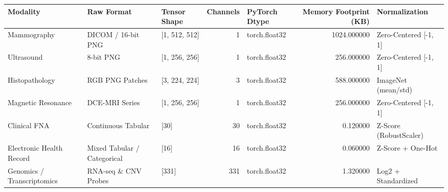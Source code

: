 \begin{tabular}{lllrlrl}
\toprule
Modality & Raw Format & Tensor Shape & Channels & PyTorch Dtype & Memory Footprint (KB) & Normalization \\
\midrule
Mammography & DICOM / 16-bit PNG & [1, 512, 512] & 1 & torch.float32 & 1024.000000 & Zero-Centered [-1, 1] \\
Ultrasound & 8-bit PNG & [1, 256, 256] & 1 & torch.float32 & 256.000000 & Zero-Centered [-1, 1] \\
Histopathology & RGB PNG Patches & [3, 224, 224] & 3 & torch.float32 & 588.000000 & ImageNet (mean/std) \\
Magnetic Resonance & DCE-MRI Series & [1, 256, 256] & 1 & torch.float32 & 256.000000 & Zero-Centered [-1, 1] \\
Clinical FNA & Continuous Tabular & [30] & 30 & torch.float32 & 0.120000 & Z-Score (RobustScaler) \\
Electronic Health Record & Mixed Tabular / Categorical & [16] & 16 & torch.float32 & 0.060000 & Z-Score + One-Hot \\
Genomics / Transcriptomics & RNA-seq \& CNV Probes & [331] & 331 & torch.float32 & 1.320000 & Log2 + Standardized \\
\bottomrule
\end{tabular}
